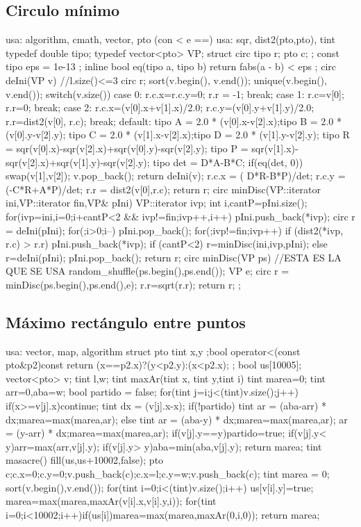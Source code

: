 \documentclass[10pt,landscape,twocolumn,a4paper,notitlepage]{article}
\begin{document}
\subsection{Circulo m\'inimo}
\begin{code}
usa: algorithm, cmath, vector, pto (con < e ==)
usa: sqr, dist2(pto,pto), tint
typedef double tipo;
typedef vector<pto> VP;
struct circ { tipo r; pto c; };
const tipo eps = 1e-13 ;
inline bool eq(tipo a, tipo b) { return fabs(a - b) < eps ; }
circ deIni(VP v){ //l.size()<=3
  circ r;  sort(v.begin(), v.end()); unique(v.begin(), v.end());
  switch(v.size()) {
    case 0: r.c.x=r.c.y=0; r.r = -1; break;
    case 1: r.c=v[0]; r.r=0; break;
    case 2: r.c.x=(v[0].x+v[1].x)/2.0;
        r.c.y=(v[0].y+v[1].y)/2.0;
        r.r=dist2(v[0], r.c); break;
    default: {
      tipo A = 2.0 * (v[0].x-v[2].x);tipo B = 2.0 * (v[0].y-v[2].y);
      tipo C = 2.0 * (v[1].x-v[2].x);tipo D = 2.0 * (v[1].y-v[2].y);
      tipo R = sqr(v[0].x)-sqr(v[2].x)+sqr(v[0].y)-sqr(v[2].y);
      tipo P = sqr(v[1].x)-sqr(v[2].x)+sqr(v[1].y)-sqr(v[2].y);
      tipo det = D*A-B*C;
      if(eq(det, 0)) {swap(v[1],v[2]); v.pop_back(); return deIni(v);}
      r.c.x = ( D*R-B*P)/det;
      r.c.y = (-C*R+A*P)/det;
      r.r = dist2(v[0],r.c);
    }
  }
  return r;
}
circ minDisc(VP::iterator ini,VP::iterator fin,VP& pIni){
  VP::iterator ivp;
  int i,cantP=pIni.size();
  for(ivp=ini,i=0;i+cantP<2 && ivp!=fin;ivp++,i++) pIni.push_back(*ivp);
  circ r = deIni(pIni);
  for(;i>0;i--) pIni.pop_back();
  for(;ivp!=fin;ivp++) if (dist2(*ivp, r.c) > r.r){
    pIni.push_back(*ivp);
    if (cantP<2) r=minDisc(ini,ivp,pIni);
    else r=deIni(pIni);
    pIni.pop_back();
  }
  return r;
}
circ minDisc(VP ps){ //ESTA ES LA QUE SE USA
  random_shuffle(ps.begin(),ps.end()); VP e;
  circ r = minDisc(ps.begin(),ps.end(),e);
  r.r=sqrt(r.r); return r;
};
\end{code}
\subsection{M\'aximo rect\'angulo entre puntos}
\begin{code}
usa: vector, map, algorithm
struct pto {
  tint x,y ;bool operator<(const pto&p2)const{
    return (x==p2.x)?(y<p2.y):(x<p2.x);
  }
};
bool us[10005];
vector<pto> v;
tint l,w;
tint maxAr(tint x, tint y,tint i){
  tint marea=0;
  tint arr=0,aba=w;
  bool partido = false;
  for(tint j=i;j<(tint)v.size();j++){
    if(x>=v[j].x)continue;
    tint dx = (v[j].x-x);
    if(!partido){
      tint ar = (aba-arr) * dx;marea=max(marea,ar);
    } else {
      tint ar = (aba-y) * dx;marea=max(marea,ar);
      ar = (y-arr) * dx;marea=max(marea,ar);
    }
    if(v[j].y==y)partido=true;
    if(v[j].y< y)arr=max(arr,v[j].y);
    if(v[j].y> y)aba=min(aba,v[j].y);
  }
  return marea;
}
tint masacre(){
  fill(us,us+10002,false);
  pto c;c.x=0;c.y=0;v.push_back(c);c.x=l;c.y=w;v.push_back(c);
  tint marea = 0;
  sort(v.begin(),v.end());
  for(tint i=0;i<(tint)v.size();i++){
    us[v[i].y]=true;
    marea=max(marea,maxAr(v[i].x,v[i].y,i));
  }
  for(tint i=0;i<10002;i++)if(us[i])marea=max(marea,maxAr(0,i,0));
  return marea;
}
\end{code}
\end{document}
